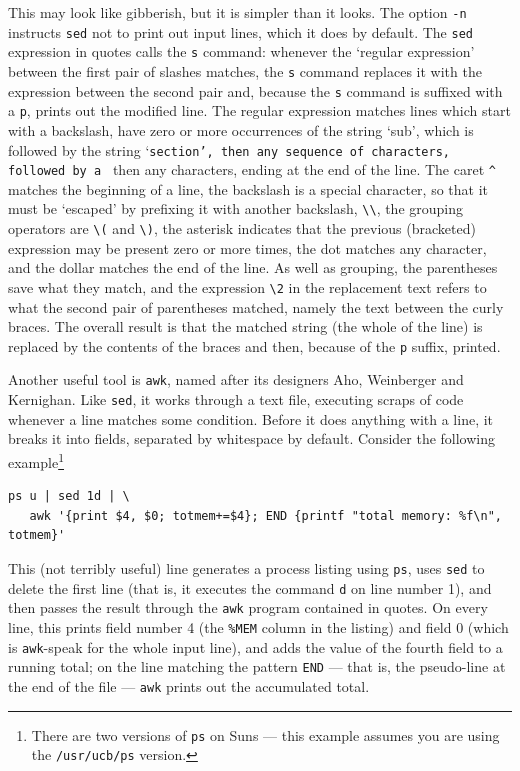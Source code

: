 \documentclass[11pt,oneside,chapters]{starlink}
\begin{document}
This may look like
gibberish, but it is simpler than it looks.  The option
\texttt{-n} instructs \texttt{sed} not to print
out input lines, which it does by default.  The
\texttt{sed} expression in quotes calls the
\texttt{s} command: whenever the `regular
expression' between the first pair of slashes matches,
the \texttt{s} command replaces it with the
expression between the second pair and, because the
\texttt{s} command is suffixed with a
\texttt{p}, prints out the modified line.  The
regular expression matches lines which start with a
backslash, have zero or more occurrences of the string
`sub', which is followed by the string
`\texttt{section{}', then any sequence of
characters, followed by a \texttt{}} then any
characters, ending at the end of the line.  The caret
\texttt{\^} matches the beginning of a line, the
backslash is a special character, so that it must be
`escaped' by prefixing it with another backslash,
\texttt{\textbackslash\textbackslash}, the grouping operators are
\texttt{\textbackslash{}(} and \texttt{\textbackslash{})}, the asterisk
indicates that the previous (bracketed) expression may
be present zero or more times, the dot matches any
character, and the dollar matches the end of the line.
As well as grouping, the parentheses save what they
match, and the expression \texttt{\textbackslash{}2} in the
replacement text refers to what the second pair of
parentheses matched, namely the text between the curly
braces.  The overall result is that the matched string
(the whole of the line) is replaced by the contents of
the braces and then, because of the \texttt{p}
suffix, printed.

Another useful tool is \texttt{awk}, named after
its designers Aho, Weinberger and Kernighan.  Like
\texttt{sed}, it works through a text file,
executing scraps of code whenever a line matches some
condition.  Before it does anything with a line, it
breaks it into fields, separated by whitespace by
default.  Consider the following example\footnote{There
are two versions of \texttt{ps} on Suns --- this
example assumes you are using the
\texttt{/usr/ucb/ps} version.}

\begin{verbatim}
ps u | sed 1d | \
   awk '{print $4, $0; totmem+=$4}; END {printf "total memory: %f\n", totmem}'
\end{verbatim}

This (not terribly useful) line generates a process
listing using \texttt{ps}, uses \texttt{sed} to
delete the first line (that is, it executes the command
\texttt{d} on line number 1), and then passes the
result through the \texttt{awk} program contained in
quotes.  On every line, this prints field number 4 (the
\texttt{\%MEM} column in the listing) and field 0
(which is \texttt{awk}-speak for the whole input
line), and adds the value of the fourth field to a
running total; on the line matching the pattern
\texttt{END} --- that is, the pseudo-line at the end
of the file --- \texttt{awk} prints out the
accumulated total.
\end{document}
